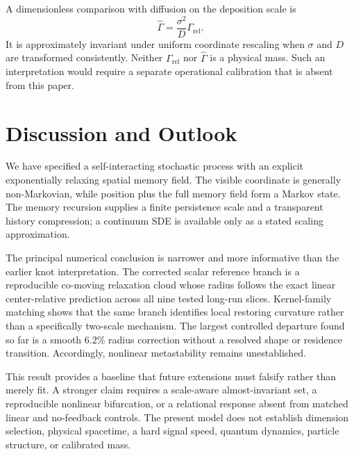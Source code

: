 \documentclass[reprint,amsmath,amssymb,aps,prd,nofootinbib,floatfix]{revtex4-2}
\begin{document}
A dimensionless comparison with diffusion on the deposition scale is
\begin{equation}
\widehat\Gamma=\frac{\sigma^2}{D}\Gamma_{\mathrm{rel}}.
\end{equation}
It is approximately invariant under uniform coordinate rescaling when
$\sigma$ and $D$ are transformed consistently.
Neither $\Gamma_{\mathrm{rel}}$ nor $\widehat\Gamma$ is a physical mass.
Such an interpretation would require a separate operational calibration that
is absent from this paper.
\section{Discussion and Outlook}

We have specified a self-interacting stochastic process with an explicit
exponentially relaxing spatial memory field.
The visible coordinate is generally non-Markovian, while position plus the
full memory field form a Markov state.
The memory recursion supplies a finite persistence scale and a transparent
history compression; a continuum SDE is available only as a stated scaling
approximation.

The principal numerical conclusion is narrower and more informative than the
earlier knot interpretation.
The corrected scalar reference branch is a reproducible co-moving relaxation
cloud whose radius follows the exact linear center-relative prediction across
all nine tested long-run slices.
Kernel-family matching shows that the same branch identifies local restoring
curvature rather than a specifically two-scale mechanism.
The largest controlled departure found so far is a smooth $6.2\%$ radius
correction without a resolved shape or residence transition.
Accordingly, nonlinear metastability remains unestablished.

This result provides a baseline that future extensions must falsify rather
than merely fit.
A stronger claim requires a scale-aware almost-invariant set, a reproducible
nonlinear bifurcation, or a relational response absent from matched linear and
no-feedback controls.
The present model does not establish dimension selection, physical spacetime,
a hard signal speed, quantum dynamics, particle structure, or calibrated mass.


\end{document}
